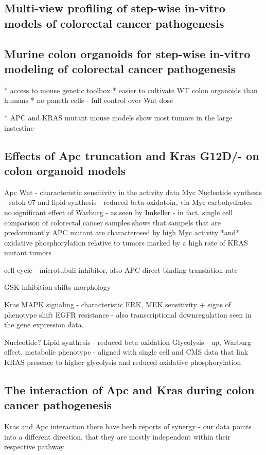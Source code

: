 \begin{flushleft}
\section{Multi-view profiling of step-wise in-vitro models of colorectal cancer pathogenesis}



\subsection{Murine colon organoids for step-wise in-vitro modeling of colorectal cancer pathogenesis}

* access to mouse genetic toolbox
* easier to cultivate WT colon organoids than humans 
* no paneth cells - full control over Wnt dose 

* APC and KRAS mutant mouse models show most tumors in the large instestine \citep{luoMutatedRasAsp122009}

\subsection{Effects of Apc truncation and Kras G12D/- on colon organoid models}

Apc 
Wnt - characteristic sensitivity in the activity data
Myc 
Nucleotide synthesis - satoh 07 and 
lipid synthesis - reduced beta-oxidatoin, via Myc
carbohydrates - no significant effect of Warburg - as seen by Imkeller  - in fact, single cell comparison of colorectal cancer samples shows that sampels that are predominantly APC mutant are characterosed by high Myc activity *and* oxidative phosphorylation relative to tumors marked by a high rate of KRAS mutant tumors

cell cycle - microtubuli inhibitor, also APC direct binding
translation rate

GSK inhibition shifts morphology


Kras
MAPK signaling - characteristic ERK, MEK sensitivity + signs of phenotype shift 
EGFR resistance - also transcriptional downregulation seen in the gene expression data.

Nucleotide?
Lipid synthesis - reduced beta oxidation
Glycolysis - up, Warburg effect, metabolic phenotype - aligned with single cell and CMS data that link KRAS presence to higher glycolysis and reduced oxidative phosphorylation 

\subsection{The interaction of Apc and Kras during colon cancer pathogenesis}
Kras and Apc interaction
there have beeb reports of synergy \citep{luoMutatedRasAsp122009} - our data points into a different direction, that they are mostly independent within their respective pathway 


\end{flushleft}
